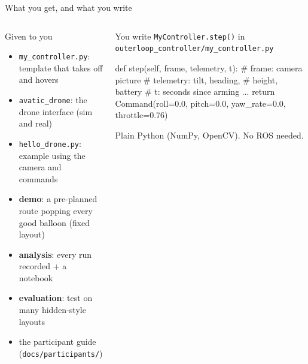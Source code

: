 \documentclass[aspectratio=169,11pt]{beamer}
\newcommand{\code}[1]{\texttt{\small #1}}
\begin{document}
\begin{frame}[fragile]{What you get, and what you write}
  \begin{columns}[T]
    \begin{block}{Given to you}
      \small
      \begin{itemize}
        \item \code{my\_controller.py}: template that takes off and hovers
        \item \code{avatic\_drone}: the drone interface (sim and real)
        \item \code{hello\_drone.py}: example using the camera and commands
        \item \textbf{demo}: a pre-planned route popping every good balloon (fixed layout)
        \item \textbf{analysis}: every run recorded + a notebook
        \item \textbf{evaluation}: test on many hidden-style layouts
        \item the participant guide (\code{docs/participants/})
      \end{itemize}
    \end{block}
    \begin{alertblock}{You write}
      \small
      \code{MyController.step()} in\\ \code{outerloop\_controller/my\_controller.py}
\begin{semiverbatim}\scriptsize
def step(self, frame, telemetry, t):
    # frame:     camera picture
    # telemetry: tilt, heading,
    #            height, battery
    # t:         seconds since arming
    ...
    return Command(roll=0.0,
                   pitch=0.0,
                   yaw\_rate=0.0,
                   throttle=0.76)
\end{semiverbatim}
      Plain Python (NumPy, OpenCV). No ROS needed.
    \end{alertblock}
  \end{columns}
\end{frame}
\end{document}
